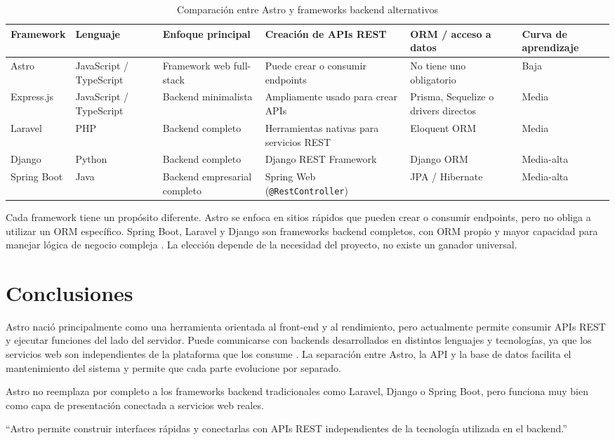 \documentclass[12pt]{article}
\begin{document}
\begin{table}[h]
\centering
\small
\begin{tabular}{@{}p{1.7cm}p{2cm}p{2.6cm}p{3.1cm}p{2.6cm}p{1.8cm}@{}}
\toprule
\textbf{Framework} & \textbf{Lenguaje} & \textbf{Enfoque principal} & \textbf{Creación de APIs REST} & \textbf{ORM / acceso a datos} & \textbf{Curva de aprendizaje} \\
\midrule
Astro & JavaScript / TypeScript & Framework web full-stack & Puede crear o consumir endpoints & No tiene uno obligatorio & Baja \\
Express.js & JavaScript / TypeScript & Backend minimalista & Ampliamente usado para crear APIs & Prisma, Sequelize o drivers directos & Media \\
Laravel & PHP & Backend completo & Herramientas nativas para servicios REST & Eloquent ORM & Media \\
Django & Python & Backend completo & Django REST Framework & Django ORM & Media-alta \\
Spring Boot & Java & Backend empresarial completo & Spring Web (\texttt{@RestController}) & JPA / Hibernate & Media-alta \\
\bottomrule
\end{tabular}
\caption{Comparación entre Astro y frameworks backend alternativos}
\end{table}

Cada framework tiene un propósito diferente. Astro se enfoca en sitios rápidos que pueden crear o consumir endpoints, pero no obliga a utilizar un ORM específico. Spring Boot, Laravel y Django son frameworks backend completos, con ORM propio y mayor capacidad para manejar lógica de negocio compleja \parencite{golzadeh2024testing}. La elección depende de la necesidad del proyecto, no existe un ganador universal.

\section{Conclusiones}

Astro nació principalmente como una herramienta orientada al front-end y al rendimiento, pero actualmente permite consumir APIs REST y ejecutar funciones del lado del servidor. Puede comunicarse con backends desarrollados en distintos lenguajes y tecnologías, ya que los servicios web son independientes de la plataforma que los consume \parencite{fielding2002principled}. La separación entre Astro, la API y la base de datos facilita el mantenimiento del sistema y permite que cada parte evolucione por separado.

Astro no reemplaza por completo a los frameworks backend tradicionales como Laravel, Django o Spring Boot, pero funciona muy bien como capa de presentación conectada a servicios web reales.

\begin{displayquote}
``Astro permite construir interfaces rápidas y conectarlas con APIs REST independientes de la tecnología utilizada en el backend.''
\end{displayquote}

\printbibliography
\end{document}
